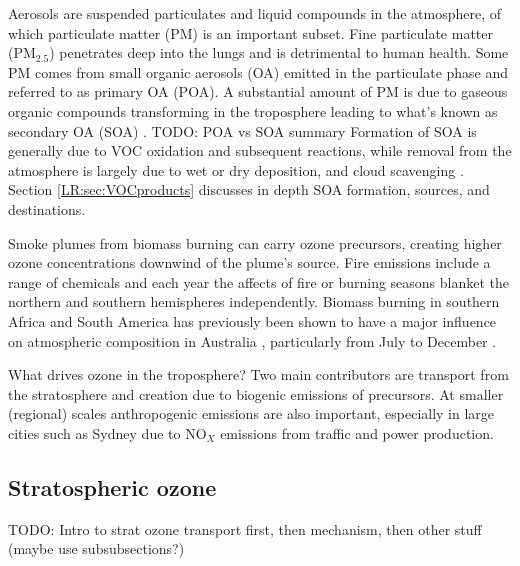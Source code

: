 	    Aerosols are suspended particulates and liquid compounds in the atmosphere, of which particulate matter (PM) is an important subset.
	    Fine particulate matter (PM$_{2.5}$) penetrates deep into the lungs and is detrimental to human health.
	    Some PM comes from small organic aerosols (OA) emitted in the particulate phase and referred to as primary OA (POA).
	    A substantial amount of PM is due to gaseous organic compounds transforming in the troposphere leading to what's known as secondary OA (SOA) \citep{Kroll2008}.
	    TODO: POA vs SOA summary
	    Formation of SOA is generally due to VOC oxidation and subsequent reactions, while removal from the atmosphere is largely due to wet or dry deposition, and cloud scavenging \citep{Kanakidou2005}.
	    Section \ref{LR:sec:VOCproducts} discusses in depth SOA formation, sources, and destinations.
	    
      Smoke plumes from biomass burning can carry ozone precursors, creating higher ozone concentrations downwind of the plume's source.
      Fire emissions include a range of chemicals and each year the affects of fire or burning seasons blanket the northern and southern hemispheres independently.
      Biomass burning in southern Africa and South America has previously been shown to have a major influence on atmospheric composition in Australia \citep{Oltmans2001, Gloudemans2006, Edwards2006}, particularly from July to December \citep{Pak2003, Liu2016}.
      
      What drives ozone in the troposphere? Two main contributors are transport from the stratosphere and creation due to biogenic emissions of precursors. 
      At smaller (regional) scales anthropogenic emissions are also important, especially in large cities such as Sydney due to NO$_X$ emissions from traffic and power production.
  \subsection{Stratospheric ozone}
    
    TODO: Intro to strat ozone transport first, then mechanism, then other stuff (maybe use subsubsections?)
    
